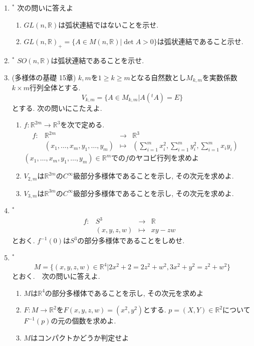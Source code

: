 \documentclass[dvipdfmx,a4paper,11pt]{article}
\newcommand{\R}{\mathbb{R}}
\theoremstyle{definition}
\begin{document}
\begin{enumerate}[label=\textbf{問}1.\arabic*]
\item  $^{*}$ 次の問いに答えよ
	\begin{enumerate}
	\item $GL(n, \R) $は弧状連結ではないことを示せ.
	\item $GL(n, \R)_{+}=\{ A \in M(n,\R) | \det A > 0\}$は弧状連結であること示せ.
	\end{enumerate}

\item $^{*}$ $SO(n, \R) $は弧状連結であることを示せ.

\item (多様体の基礎 15章) $k,m$を$1 \ge k \ge m$となる自然数とし$M_{k, m}$を実数係数$k \times m$行列全体とする.
$$
V_{k,m}= \{ A \in M_{k, m}| A ({}^{t}A) = E\}
$$
とする. 次の問いにこたえよ.
	\begin{enumerate}
	\item $f : \R^{2m} \rightarrow \R^3$を次で定める.
$$
\begin{array}{ccccc}
f: &\R^{2m}& \rightarrow & \R^{3} & \\
&(x_{1}, \ldots, x_m, y_1, \ldots, y_m) & \longmapsto & 
(\sum_{i=1}^{m} x_{i}^{2}, \sum_{i=1}^{m} y_{i}^{2}, \sum_{i=1}^{m} x_{i}y_{i})&
\end{array}
$$
	$(x_{1}, \ldots, x_m, y_1, \ldots, y_m) \in \R^m$での$f$のヤコビ行列を求めよ
	\item $V_{2,m}$は$\R^{2m}$の$C^{\infty}$級部分多様体であることを示し, その次元を求めよ.
	\item$V_{3,m}$は$\R^{3m}$の$C^{\infty}$級部分多様体であることを示し, その次元を求めよ.
	\end{enumerate}
	
\item $^{*}$ 
	$$
\begin{array}{ccccc}
f: &S^{3}& \rightarrow & \R & \\
&(x,y,z,w) & \longmapsto & xy - zw&
\end{array}
$$
とおく.  $f^{-1}(0)$は$S^{3}$の部分多様体であることをしめせ.

\newpage
\item $^{*}$ 
$$
M = \{ (x,y,z,w) \in\R^4  | 2x^2 + 2 = 2 z^2 + w^2, 3x^2 + y^2 = z^2 + w^2\}
$$
とおく.　次の問いに答えよ.
	\begin{enumerate}
	\item $M$は$\R^4$の部分多様体であることを示し, その次元を求めよ
	\item $F : M \rightarrow \R^2$を$F(x,y,z,w) = (x^2, y^2)$とする. $p=(X,Y) \in \R^2$について$F^{-1}(p)$の元の個数を求めよ.
	\item $M$はコンパクトかどうか判定せよ
	\end{enumerate}



\end{enumerate}
\end{document}
